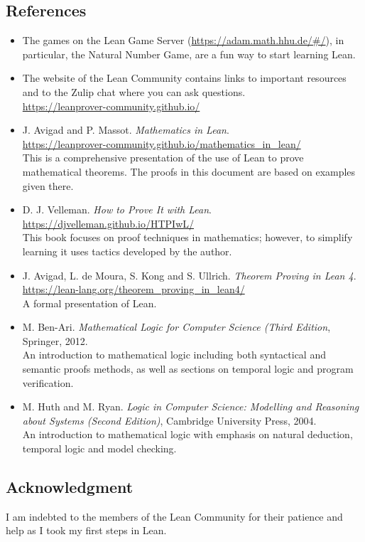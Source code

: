 \subsection*{References}
\begin{itemize}
\item The games on the Lean Game Server (\url{https://adam.math.hhu.de/#/}), in particular, the Natural Number Game, are a fun way to start learning Lean.
\item The website of the Lean Community contains links to important resources and to the Zulip chat where you can ask questions.\\
\indnt{}\url{https://leanprover-community.github.io/}
\item J. Avigad and P. Massot. \textit{Mathematics in Lean}.\\
\indnt\url{https://leanprover-community.github.io/mathematics_in_lean/}\\
This is a comprehensive presentation of the use of Lean to prove mathematical theorems. The proofs in this document are based on examples given there.
\item D. J. Velleman. \textit{How to Prove It with Lean}.\\
\indnt{}\url{https://djvelleman.github.io/HTPIwL/}\\
This book focuses on proof techniques in mathematics; however, to simplify learning it uses tactics developed by the author.
\item J. Avigad, L. de Moura, S. Kong and S. Ullrich. 
\textit{Theorem Proving in Lean 4}. \\
\indnt{}\url{https://lean-lang.org/theorem_proving_in_lean4/}\\
A formal presentation of Lean.
\item M. Ben-Ari. \textit{Mathematical Logic for Computer Science (Third Edition}, Springer, 2012.\\
An introduction to mathematical logic including both syntactical and semantic proofs methods, as well as sections on temporal logic and program verification.
\item M. Huth and M. Ryan. \textit{Logic in Computer Science: Modelling and Reasoning about Systems (Second Edition)}, Cambridge University Press, 2004.\\
An introduction to mathematical logic with emphasis on natural deduction, temporal logic and model checking.
\end{itemize}

\subsection*{Acknowledgment}

I am indebted to the members of the Lean Community for their patience and help as I took my first steps in Lean.
